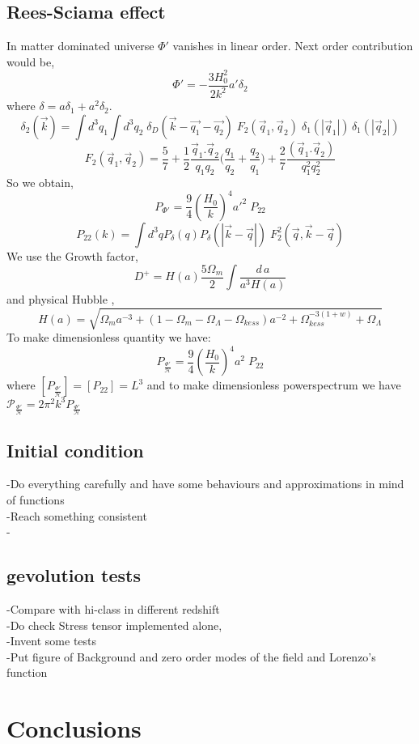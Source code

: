 \documentclass[a4paper,11pt]{article}
\def\be{\begin{equation}}
\def\ee{\end{equation}}
\begin{document}
\subsection{Rees-Sciama effect}
In matter dominated universe ${\Phi'}$ vanishes in linear order. Next order contribution would be,
\be
{\Phi'} = -\frac{3 H_0^2 }{2 k^2} {a'} \delta_2
\ee
where $\delta= a \delta_1 +a^2 \delta_2 $.
\be
\delta_2 (\vec{k}) = \int d^3 {q_1} \int d^3{q_2 } \;  \delta_D(\vec{k}-\vec{q_1}-\vec{q_2}) \;  F_2(\vec{q}_1 , \vec{q}_2)  \; \delta_1 (|\vec{q}_1|) \, \delta_1(|\vec{q}_2|)
\ee
\be
F_2(\vec{q}_1,\vec{q}_2)= \frac{5}{7} + \frac{1}{2} \frac{\vec{q}_1 . \vec{q}_2}{q_1 q_2} \Big ( \frac{q_1}{q_2} + \frac{q_2}{q_1} \Big) + \frac{2}{7} \frac{(\vec{q}_1 .\vec{q}_2)}{q_1^2 q_2^2}
\ee
So we obtain,
\be
P_{{\Phi'} }=  \frac{9}{4} (\frac{H_0}{k} )^4 {a'}^2 \; P_{22}
\ee
\be
P_{22} (k) = \int d^3 {q} P_{\delta} ({q}) P_{\delta} (|\vec{k}-\vec{q}|) \; F_2^2(\vec{q} , \vec{k} - \vec{q})
\ee
We  use the Growth factor,
\be
D^{+}= H(a) \frac{5 \Omega_m}{2} \int \frac{d \,a}{a^3 H(a)}
\ee
and physical Hubble ,
\be
H(a)=\sqrt{\Omega_m a^{-3} + (1-\Omega_m- \Omega_{\Lambda}-\Omega_{kess}) a^{-2}+ \Omega_{kess}^{-3(1+w)}+\Omega_{\Lambda}}
\ee
To make dimensionless quantity we have:
\be
P_{{\frac{\Phi'}{\mathcal{H}}} }=  \frac{9}{4} (\frac{H_0}{k} )^4 {a}^2 \; P_{22}
\ee
where $[  P_{{\frac{\Phi'}{\mathcal{H}}} }]=[P_{22}]= L^3$ and to make dimensionless powerspectrum we have $\mathcal{P}_{{\frac{\Phi'}{\mathcal{H}}} } = 2 \pi^2 k^3 P_{{\frac{\Phi'}{\mathcal{H}}} } $
\subsection{Initial condition}
-Do everything carefully and have some behaviours and approximations in mind of functions \\
-Reach something consistent\\
-
\subsection{gevolution tests}
-Compare with hi-class in different redshift\\
-Do check Stress tensor implemented alone,\\
-Invent some tests \\
-Put figure of Background and zero order modes of the field and Lorenzo's function


\section{Conclusions}
\setcounter{equation}{0}
\end{document}

